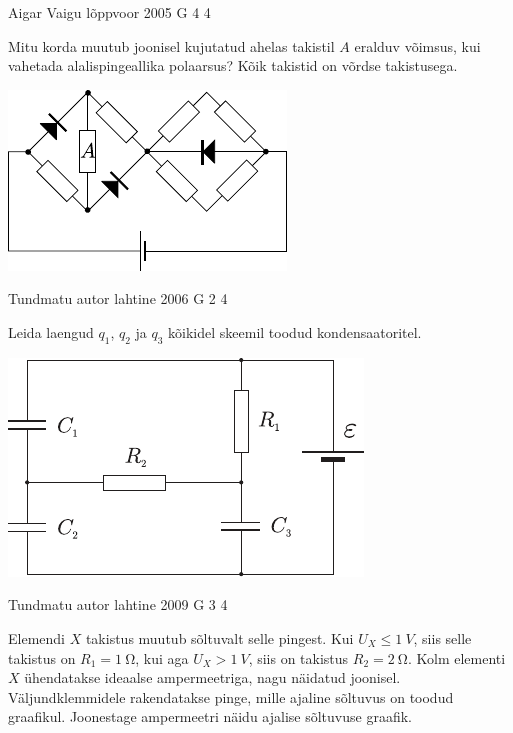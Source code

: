 \documentclass[11pt]{article}
\begin{document}
{%
{Aigar Vaigu} %
{lõppvoor} %
{2005} %
{G 4} %
{4} %
{
\ifStatement
Mitu korda muutub joonisel kujutatud ahelas takistil $A$ eralduv võimsus, kui vahetada alalispingeallika polaarsus? Kõik takistid on võrdse takistusega.

\begin{center}
	\includegraphics[width=0.6\linewidth]{2005-v3g-04-yl}
\end{center}
\fi
}

{Tundmatu autor} %
{lahtine} %
{2006} %
{G 2} %
{4} %
{
\ifStatement
Leida laengud $q_1$, $q_2$ ja $q_3$ kõikidel skeemil toodud kondensaatoritel.

\begin{center}
	\includegraphics[width=0.7\linewidth]{2006-lahg-02-yl}
\end{center}
\fi
}

{Tundmatu autor} %
{lahtine} %
{2009} %
{G 3} %
{4} %
{
\ifStatement
Elemendi $X$ takistus muutub sõltuvalt selle pingest. Kui $U_X \leq \SI{1}{V}$,
siis selle takistus on $R_1 = \SI{1}{\ohm}$, kui aga $U_X > \SI{1}{V}$, siis on takistus $R_2 =
\SI{2}{\ohm}$. Kolm elementi $X$ ühendatakse ideaalse ampermeetriga, nagu näidatud joonisel.
Väljundklemmidele rakendatakse pinge, mille ajaline sõltuvus on toodud graafikul.
Joonestage ampermeetri näidu ajalise sõltuvuse graafik.

}}
\end{document}
